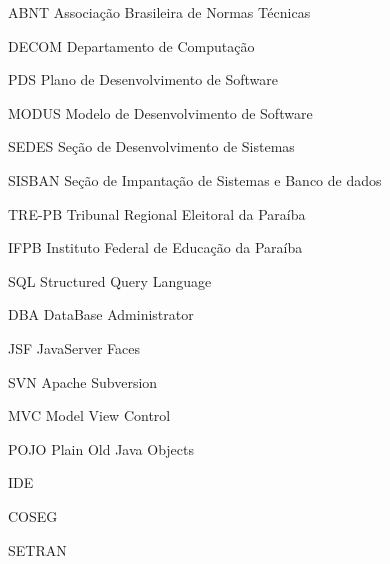 
\begin{siglas}
    \item[ABNT] Associação Brasileira de Normas Técnicas
    \item[DECOM] Departamento de Computação
    \item[PDS] Plano de Desenvolvimento de Software
    \item[MODUS] Modelo de Desenvolvimento de Software
    \item[SEDES] Seção de Desenvolvimento de Sistemas
    \item[SISBAN]Seção de Impantação de Sistemas e Banco de dados
    \item[TRE-PB] Tribunal Regional Eleitoral da Paraíba
    \item[IFPB] Instituto Federal de Educação da Paraíba
    \item[SQL] Structured Query Language
    \item[DBA] DataBase Administrator
    \item[JSF] JavaServer Faces
    \item[SVN] Apache Subversion
    \item[MVC] Model View Control
    \item[POJO] Plain Old Java Objects
    \item[IDE]
    \item[COSEG]
    \item[SETRAN] 
\end{siglas}

